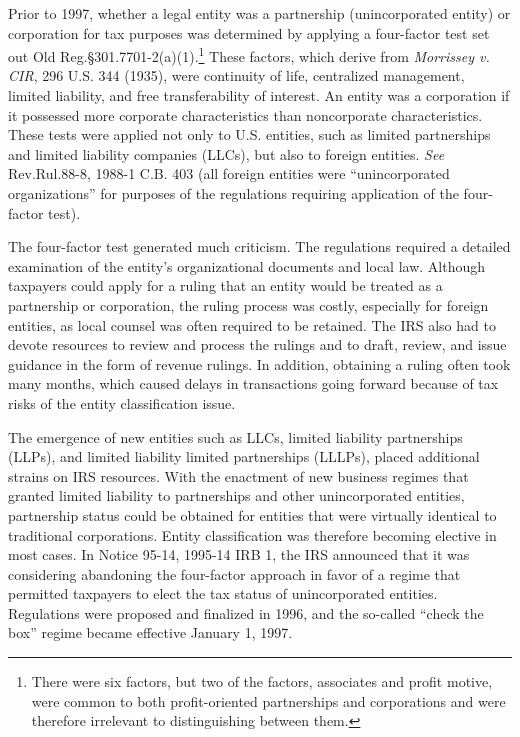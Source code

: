 Prior to 1997, whether a legal entity was a partnership (unincorporated entity) or corporation for tax purposes was determined by applying a four-factor test set out Old Reg.\@ \S 301.7701-2(a)(1).\footnote{There were six factors, but two of the factors, associates and profit motive, were common to both profit-oriented partnerships and corporations and were therefore irrelevant to distinguishing between them.} These factors, which derive from \textit{Morrissey v. CIR}, 296 U.S. 344 (1935), were continuity of life, centralized management, limited liability, and free transferability of interest.  An entity was a corporation if it possessed more corporate characteristics than noncorporate characteristics.  These tests were applied not only to U.S. entities, such as limited partnerships and limited liability companies (LLCs),  but also to foreign entities.  \emph{See} Rev.\@ Rul.\@ 88-8, 1988-1 C.B. 403 (all foreign entities were ``unincorporated organizations'' for purposes of the regulations requiring application of the four-factor test).  

The four-factor test generated much criticism.  The regulations required a detailed examination of the entity's organizational documents and local law.  Although taxpayers could apply for a ruling that an entity would be treated as a partnership or corporation, the ruling process was costly, especially for foreign entities, as local counsel was often required to be retained.  The IRS also had to devote resources to review and process the rulings and to draft, review, and issue guidance in the form of revenue rulings.  In addition, obtaining a ruling often took many months, which caused delays in transactions going forward because of tax risks of the entity classification issue.  

The emergence of new entities such as LLCs, limited liability partnerships (LLPs), and limited liability limited partnerships (LLLPs), placed additional strains on IRS resources.  With the enactment of new business regimes that granted limited liability to partnerships and other unincorporated entities, partnership status could be obtained for entities that were virtually identical to traditional corporations.  Entity classification was therefore becoming elective in most cases.  In Notice 95-14, 1995-14 IRB 1, the IRS announced that it was considering abandoning the four-factor approach in favor of a regime that permitted taxpayers to elect the tax status of unincorporated entities.  Regulations were proposed and finalized in 1996, and the so-called ``check the box'' regime became effective January 1, 1997.  

